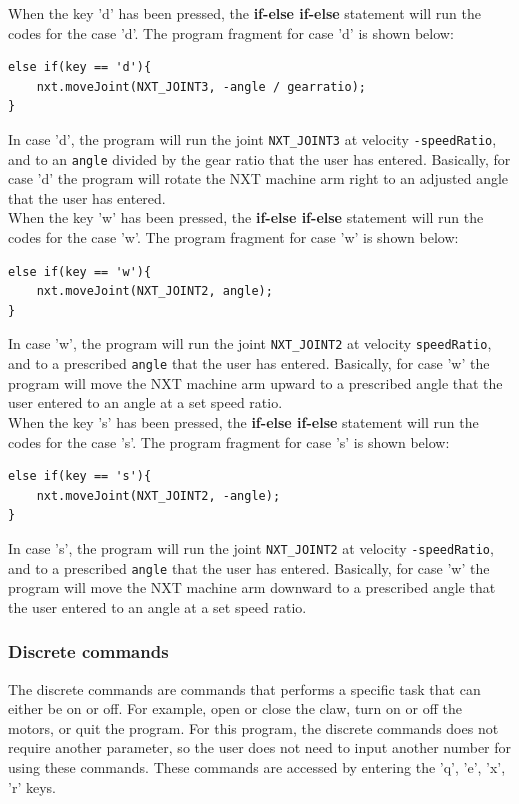 \documentclass[11pt]{article}
\begin{document}
When the key 'd' has been pressed, the {\bf if-else if-else} statement will run 
the codes for the case 'd'. The program fragment for case 'd' is shown below:
\begin{lstlisting}
else if(key == 'd'){
    nxt.moveJoint(NXT_JOINT3, -angle / gearratio);
}
\end{lstlisting}
In case 'd', the program will run the joint {\tt NXT\_JOINT3} at velocity 
{\tt -speedRatio}, and to an \verb+angle+ divided by the gear ratio that the user 
has entered. Basically, for case 'd' the program will rotate the NXT machine arm 
right to an adjusted angle that the user has entered.\\

When the key 'w' has been pressed, the {\bf if-else if-else} statement will run 
the codes for the case 'w'. The program fragment for case 'w' is shown below:
\begin{lstlisting}
else if(key == 'w'){
    nxt.moveJoint(NXT_JOINT2, angle);
}
\end{lstlisting}
In case 'w', the program will run the joint {\tt NXT\_JOINT2} at velocity 
{\tt speedRatio}, and to a prescribed {\tt angle} that the user has entered. 
Basically, for case 'w' the program will move the NXT machine arm upward to a 
prescribed angle that the user entered to an angle at a set speed ratio.\\

When the key 's' has been pressed, the {\bf if-else if-else} statement will run 
the codes for the case 's'. The program fragment for case 's' is shown below:
\begin{lstlisting}
else if(key == 's'){
    nxt.moveJoint(NXT_JOINT2, -angle);
}
\end{lstlisting}
In case 's', the program will run the joint {\tt NXT\_JOINT2} at velocity 
{\tt -speedRatio}, and to a prescribed \verb+angle+ that the user has entered. 
Basically, for case 'w' the program will move the NXT machine arm downward to 
a prescribed angle that the user entered to an angle at a set speed ratio.\\

\subsubsection*{Discrete commands}
The discrete commands are commands that performs a specific task that can either 
be on or off. For example, open or close the claw, turn on or off the motors, or 
quit the program. For this program, the discrete commands does not require another 
parameter, so the user does not need to input another number for using these 
commands. These commands are accessed by entering the 'q', 'e', 'x', 'r' keys.\\
\end{document}
